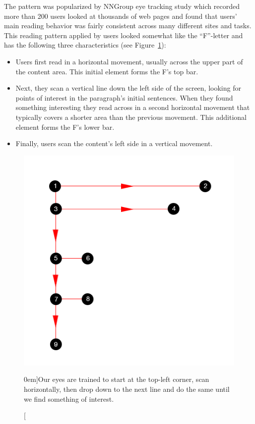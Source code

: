 The pattern was popularized by NNGroup eye tracking study which recorded more than 200 users looked at thousands of web pages and found that users’ main reading behavior was fairly consistent across many different sites and tasks. This reading pattern applied by users looked somewhat like the ``F''-letter and has the following three characteristics (see Figure~\ref{fig:f-layout}):

\begin{itemize}
	\item Users first read in a horizontal movement, usually across the upper part of the content area. This initial element forms the F’s top bar.
	
	\item Next, they scan a vertical line down the left side of the screen, looking for points of interest in the paragraph’s initial sentences. When they found something interesting they read across in a second horizontal movement that typically covers a shorter area than the previous movement. This additional element forms the F’s lower bar.
	
	\item Finally, users scan the content’s left side in a vertical movement.
\end{itemize}

\begin{figure}%
  \includegraphics[width=1\textwidth]{../figures/f-pattern.png}
  \caption[][0em]{Our eyes are trained to start at the top-left corner, scan horizontally, then drop down to the next line and do the same until we find something of interest.}
  \label{fig:f-layout}
\end{figure}


